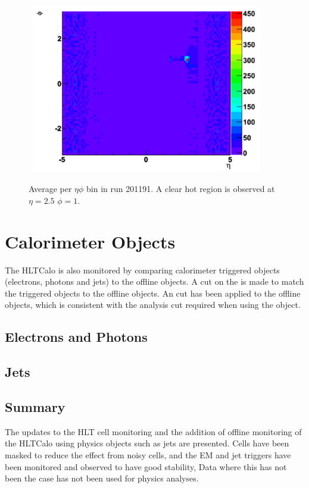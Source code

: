 \begin{figure}
\centering
\mbox{
   \includegraphics[width=0.9\textwidth]{figures/ServiceWork/Cells_HotSpot.pdf}
}
\caption[Offline EM \et{} verses L2/EF EM \et{}]{Average \et{} per $\eta \phi$ bin in run 201191. A clear hot region is observed at $\eta=2.5$ $\phi=1$. \label{SW_hotspot}}
\end{figure}



\section{Calorimeter Objects}

The HLTCalo is also monitored by comparing calorimeter triggered objects (electrons, photons and jets) to the offline objects.
A cut on the \dr{} is made to match the triggered objects to the offline objects.
An \et{} cut has been applied to the offline objects, which is consistent with the analysis cut required when using the object. 



\subsection{Electrons and Photons}




 
\subsection{Jets}
\label{HLTCalo:Jets}




\subsection{Summary}

The updates to the HLT cell monitoring and the addition of offline monitoring of the HLTCalo using physics objects such as jets are presented.
Cells have been masked to reduce the effect from noisy cells, and the EM and jet triggers have been monitored and observed to have good stability, 
Data where this has not been the case has not been used for physics analyses.
